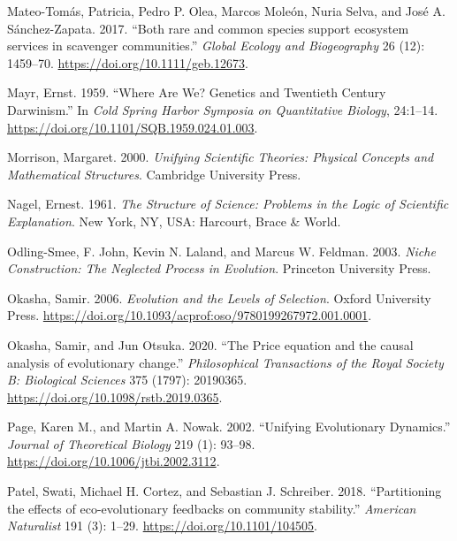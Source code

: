 \documentclass[
]{article}
\newlength{\cslhangindent}
\newlength{\cslentryspacingunit} %
\newenvironment{CSLReferences}[2] %
 {%
  \setlength{\parindent}{0pt}
  \ifodd #1
  \let\oldpar\par
  \def\par{\hangindent=\cslhangindent\oldpar}
  \fi
  \setlength{\parskip}{#2\cslentryspacingunit}
 }%
 {}
\begin{document}
\begin{CSLReferences}{1}{0}
\leavevmode{}%
Mateo-Tomás, Patricia, Pedro P. Olea, Marcos Moleón, Nuria Selva, and
José A. Sánchez-Zapata. 2017. {``{Both rare and common species support
ecosystem services in scavenger communities}.''} \emph{Global Ecology
and Biogeography} 26 (12): 1459--70.
\url{https://doi.org/10.1111/geb.12673}.

\leavevmode{}%
Mayr, Ernst. 1959. {``Where Are We? Genetics and Twentieth Century
Darwinism.''} In \emph{Cold Spring Harbor Symposia on Quantitative
Biology}, 24:1--14. \url{https://doi.org/10.1101/SQB.1959.024.01.003}.

\leavevmode{}%
Morrison, Margaret. 2000. \emph{Unifying Scientific Theories: Physical
Concepts and Mathematical Structures}. Cambridge University Press.

\leavevmode{}%
Nagel, Ernest. 1961. \emph{The Structure of Science: Problems in the
Logic of Scientific Explanation}. New York, NY, USA: Harcourt, Brace \&
World.

\leavevmode{}%
Odling-Smee, F. John, Kevin N. Laland, and Marcus W. Feldman. 2003.
\emph{Niche Construction: The Neglected Process in Evolution}. Princeton
University Press.

\leavevmode{}%
Okasha, Samir. 2006. \emph{Evolution and the Levels of Selection}.
Oxford University Press.
\url{https://doi.org/10.1093/acprof:oso/9780199267972.001.0001}.

\leavevmode{}%
Okasha, Samir, and Jun Otsuka. 2020. {``{The Price equation and the
causal analysis of evolutionary change}.''} \emph{Philosophical
Transactions of the Royal Society B: Biological Sciences} 375 (1797):
20190365. \url{https://doi.org/10.1098/rstb.2019.0365}.

\leavevmode{}%
Page, Karen M., and Martin A. Nowak. 2002. {``Unifying Evolutionary
Dynamics.''} \emph{Journal of Theoretical Biology} 219 (1): 93--98.
\url{https://doi.org/10.1006/jtbi.2002.3112}.

\leavevmode{}%
Patel, Swati, Michael H. Cortez, and Sebastian J. Schreiber. 2018.
{``{Partitioning the effects of eco-evolutionary feedbacks on community
stability}.''} \emph{American Naturalist} 191 (3): 1--29.
\url{https://doi.org/10.1101/104505}.


\end{CSLReferences}
\end{document}
